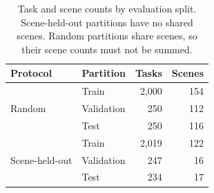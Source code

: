 \begin{table}[pos=htbp]
\centering
\caption{Task and scene counts by evaluation split. Scene-held-out partitions have no shared scenes. Random partitions share scenes, so their scene counts must not be summed.}
\label{tab:splits}
\small
\setlength{\tabcolsep}{4pt}
\renewcommand{\arraystretch}{1.08}
\begin{tabular}{@{}llrr@{}}
\toprule
Protocol & Partition & Tasks & Scenes \\
\midrule
\multirow{3}{*}{Random} & Train & 2,000 & 154 \\
 & Validation & 250 & 112 \\
 & Test & 250 & 116 \\
\midrule
\multirow{3}{*}{Scene-held-out} & Train & 2,019 & 122 \\
 & Validation & 247 & 16 \\
 & Test & 234 & 17 \\
\bottomrule
\end{tabular}
\end{table}
